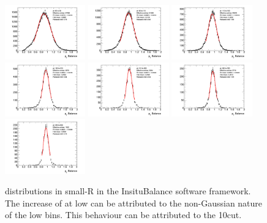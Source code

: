 \begin{figure}[t]
    \includegraphics[width=0.31\textwidth]{plots/insitu/fits_insitubalance_smallR/Zeejet_Nominal_Bin6.png}
    \includegraphics[width=0.31\textwidth]{plots/insitu/fits_insitubalance_smallR/Zeejet_Nominal_Bin7.png}
    \includegraphics[width=0.31\textwidth]{plots/insitu/fits_insitubalance_smallR/Zeejet_Nominal_Bin8.png}
    \includegraphics[width=0.31\textwidth]{plots/insitu/fits_insitubalance_smallR/Zeejet_Nominal_Bin9.png}
    \includegraphics[width=0.31\textwidth]{plots/insitu/fits_insitubalance_smallR/Zeejet_Nominal_Bin10.png}
    \includegraphics[width=0.31\textwidth]{plots/insitu/fits_insitubalance_smallR/Zeejet_Nominal_Bin11.png}
    \includegraphics[width=0.31\textwidth]{plots/insitu/fits_insitubalance_smallR/Zeejet_Nominal_Bin12.png}
    \caption{\ptbal distributions in small-R \zeejets in the InsituBalance software framework. The increase of \rdb at low \ptref can be attributed to the non-Gaussian nature of the low \ptref bins. This behaviour can be attributed to the 10\GeV \ptj cut.\label{fig:insitu:insitubalancesmallrfits}}
\end{figure}

